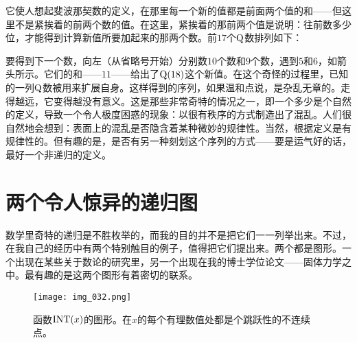 它使人想起斐波那契数的定义，在那里每一个新的值都是前面两个值的和——但这里不是紧挨着的前两个数的值。在这里，紧挨着的那前两个值是说明：往前数多少位，才能得到计算新值所要加起来的那两个数。前$17$个$\operatorname{Q}$数排列如下：
\begin{center}
\end{center}
要得到下一个数，向左（从省略号开始）分别数$10$个数和$9$个数，遇到$5$和$6$，如箭头所示。它们的和——$11$——给出了$\operatorname{Q}(18)$这个新值。在这个奇怪的过程里，已知的一列$\operatorname{Q}$数被用来扩展自身。这样得到的序列，如果温和点说，是杂乱无章的。走得越远，它变得越没有意义。这是那些非常奇特的情况之一，即一个多少是个自然的定义，导致一个令人极度困惑的现象：以很有秩序的方式制造出了混乱。人们很自然地会想到：表面上的混乱是否隐含着某种微妙的规律性。当然，根据定义是有规律性的。但有趣的是，是否有另一种刻划这个序列的方式——要是运气好的话，最好一个非递归的定义。

\section{两个令人惊异的递归图}

数学里奇特的递归是不胜枚举的，而我的目的并不是把它们一一列举出来。不过，在我自己的经历中有两个特别触目的例子，值得把它们提出来。两个都是图形。一个出现在某些关于数论的研究里，另一个出现在我的博士学位论文——固体力学之中。最有趣的是这两个图形有着密切的联系。

\begin{figure}

\texttt{[image: img\_032.png]}
\caption[函数$\INT(x)$的图形。]
  {函数$\INT(x)$的图形。在$x$的每个有理数值处都是个跳跃性的不连续点。}
\end{figure}

